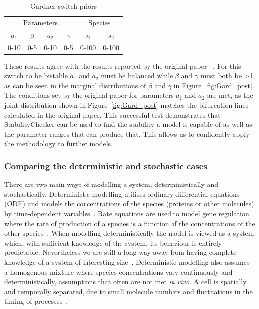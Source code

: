\begin{table}[p]
\centering
\caption{Gardner switch priors}
\label{tab:gard}
\begin{tabular}{cccc|cc}
\multicolumn{4}{c|}{Parameters} & \multicolumn{2}{c}{Species} \\ %
$a_1$   & $\beta$   & $a_2$   & $\gamma$  &   $s_1$      &       $s_2$   \\
0-10    & 0-5       & 0-10    &  0-5      &      0-100   &          0-100   
\end{tabular}
\end{table}

These results agree with the results reported by the original paper~\autocite{Gardner:2000vha} . For this switch to be bistable $a_1$ and $a_2$ must be balanced while $\beta$ and $\gamma$ must both be \textgreater 1, as can be seen in the marginal distributions of $\beta$ and $\gamma$ in Figure~\ref{fig:Gard_post}. The conditions set by the original paper for parameters $a_1$ and $a_2$ are met, as the joint distribution shown in Figure~\ref{fig:Gard_post} matches the bifurcation lines calculated in the original paper. 
This successful test demonstrates that StabilityChecker can be used to find the stability a model is capable of as well as the parameter ranges that can produce that. This allows us to confidently apply the methodology to further models.
\newpage
\subsubsection{Comparing the deterministic and stochastic cases} 
    
There are two main ways of modelling a system, deterministically and stochastically. Deterministic modelling utilises ordinary differential equations (ODE) and models the concentrations of the species (proteins or other molecules) by time-dependent variables~\autocite{deJong:2002ft}. Rate equations are used to model gene regulation where the rate of production of a species is a function of the concentrations of the other species~\autocite{deJong:2002ft}. When modelling deterministically the model is viewed as a system which, with sufficient knowledge of the system, its behaviour is entirely predictable. Nevertheless we are still a long way away from having complete knowledge of a system of interesting size~\autocite{wilkinson:2006}. Deterministic modelling also assumes a homogenous mixture where species concentrations vary continuously and deterministically, assumptions that often are not met \textit{in vivo}. A cell is spatially and temporally separated, due to small molecule numbers and fluctuations in the timing of processes~\autocite{deJong:2002ft}.  
   
